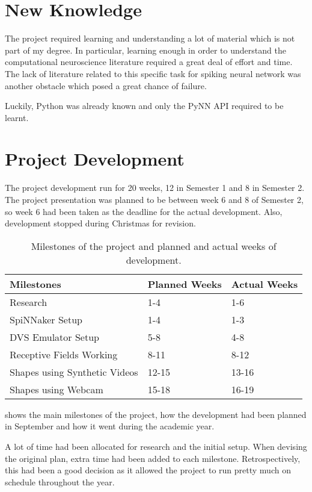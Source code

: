 \section{New Knowledge}
The project required learning and understanding a lot of material which is not part of my degree. In particular, learning enough in order to understand the computational neuroscience literature required a great deal of effort and time. The lack of literature related to this specific task for spiking neural network was another obstacle which posed a great chance of failure. 

Luckily, Python was already known and only the PyNN API required to be learnt. 

\section{Project Development}
The project development run for 20 weeks, 12 in Semester 1 and 8 in Semester 2. The project presentation was planned to be between week 6 and 8 of Semester 2, so week 6 had been taken as the deadline for the actual development. Also, development stopped during Christmas for revision.

\begin{table}[ht]
\centering
\begin{tabular}{l|ll}
Milestones                    & Planned Weeks & Actual Weeks \\ \hline
Research                      & 1-4           & 1-6          \\
SpiNNaker Setup               & 1-4           & 1-3          \\
DVS Emulator Setup            & 5-8           & 4-8          \\
Receptive Fields Working      & 8-11          & 8-12         \\
Shapes using Synthetic Videos & 12-15         & 13-16        \\
Shapes using Webcam           & 15-18         & 16-19       
\end{tabular}
\caption{Milestones of the project and planned and actual weeks of development.}
\label{table:development}
\end{table}

 shows the main milestones of the project, how the development had been planned in September and how it went during the academic year.

A lot of time had been allocated for research and the initial setup. When devising the original plan, extra time had been added to each milestone. Retrospectively, this had been a good decision as it allowed the project to run pretty much on schedule throughout the year.

